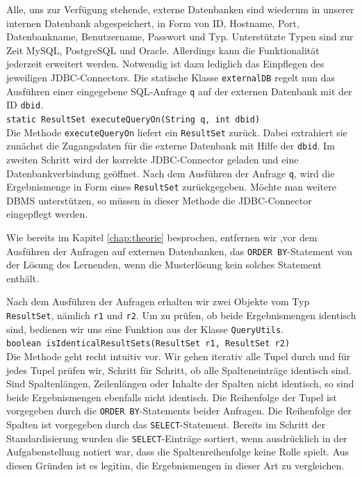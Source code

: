Alle, uns zur Verfügung stehende, externe Datenbanken sind wiederum in unserer internen Datenbank abgespeichert, in Form von ID, Hostname, Port, Datenbankname, Benutzername, Passwort und Typ. Unterstützte Typen sind zur Zeit MySQL, PostgreSQL und Oracle. Allerdings kann die Funktionalität jederzeit erweitert werden. Notwendig ist dazu lediglich das Einpflegen des jeweiligen JDBC-Connectors. Die statische Klasse \verb|externalDB| regelt nun das Ausführen einer eingegebene SQL-Anfrage \verb|q| auf der externen Datenbank mit der ID \verb|dbid|. \\
\verb|static ResultSet executeQueryOn(String q, int dbid)|\\
Die Methode \verb|executeQueryOn| liefert ein \verb|ResultSet| zurück. Dabei extrahiert sie zunächst die Zugangsdaten für die externe Datenbank mit Hilfe der \verb|dbid|. Im zweiten Schritt wird der korrekte JDBC-Connector geladen und eine Datenbankverbindung geöffnet. Nach dem Ausführen der Anfrage \verb|q|, wird die Ergebnismenge in Form eines \verb|ResultSet| zurückgegeben. Möchte man weitere DBMS unterstützen, so müssen in dieser Methode die JDBC-Connector eingepflegt werden.

Wie bereits im Kapitel \ref{chap:theorie} besprochen, entfernen wir ,vor dem Ausführen der Anfragen auf externen Datenbanken, das \verb|ORDER BY|-Statement von der Lösung des Lernenden, wenn die Musterlösung kein solches Statement enthält.

Nach dem Ausführen der Anfragen erhalten wir zwei Objekte vom Typ \verb|ResultSet|, nämlich \verb|r1| und \verb|r2|. Um zu prüfen, ob beide Ergebnismengen identisch sind, bedienen wir uns eine Funktion aus der Klasse \verb|QueryUtils|.\\
\verb|boolean isIdenticalResultSets(ResultSet r1, ResultSet r2)|\\
Die Methode geht recht intuitiv vor. Wir gehen iterativ alle Tupel durch und für jedes Tupel prüfen wir, Schritt für Schritt, ob alle Spalteneinträge identisch sind. Sind Spaltenlängen, Zeilenlängen oder Inhalte der Spalten nicht identisch, so sind beide Ergebnismengen ebenfalls nicht identisch. Die Reihenfolge der Tupel ist vorgegeben durch die \verb|ORDER BY|-Statements beider Anfragen. Die Reihenfolge der Spalten ist vorgegeben durch das \verb|SELECT|-Statement. Bereits im Schritt der Standardisierung wurden die \verb|SELECT|-Einträge sortiert, wenn ausdrücklich in der Aufgabenstellung notiert war, dass die Spaltenreihenfolge keine Rolle spielt. Aus diesen Gründen ist es legitim, die Ergebnismengen in dieser Art zu vergleichen.

